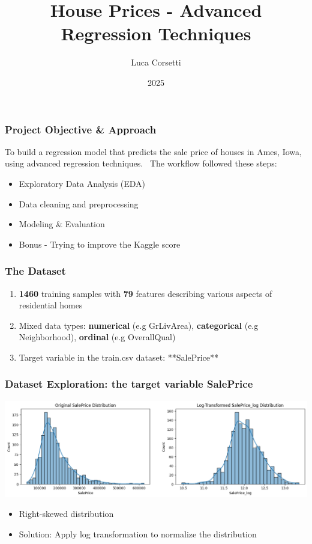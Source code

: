 \documentclass{beamer}
\title{House Prices - Advanced Regression Techniques}
\author{Luca Corsetti}
\institute{University of Bologna}
\date{2025}
\begin{document}
\frame{\titlepage}

\begin{frame}
\frametitle{Project Objective \& Approach}
To build a regression model that predicts the sale price of houses in Ames, Iowa, using advanced regression techniques.
\
The workflow followed these steps:

\begin{itemize}
    \item Exploratory Data Analysis (EDA)
    \item Data cleaning and preprocessing
    \item Modeling \& Evaluation
    \item Bonus - Trying to improve the Kaggle score
\end{itemize}
\end{frame}

\begin{frame}
\frametitle{The Dataset}
\begin{enumerate}
    \item \textbf{1460} training samples with \textbf{79} features describing various aspects of residential homes
    \item Mixed data types: \textbf{numerical} (e.g GrLivArea), \textbf{categorical} (e.g Neighborhood), \textbf{ordinal} (e.g OverallQual)
    \item Target variable in the train.csv dataset: **SalePrice**
\end{enumerate}
\end{frame}

\begin{frame}
\frametitle{Dataset Exploration: the target variable \textbf{SalePrice}}
\centering
    \includegraphics[width=1\textwidth]{../challenge/main_files/main_30_0.png}

\begin{itemize}
    \item Right-skewed distribution
    \item Solution: Apply log transformation to normalize the distribution
\end{itemize}
\end{frame}
\end{document}
